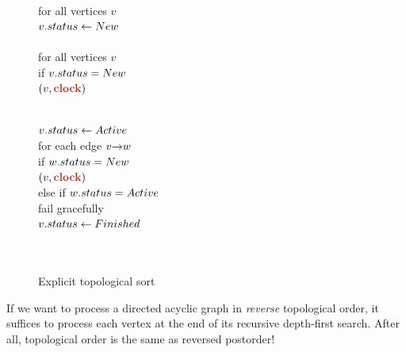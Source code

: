 \begin{figure}[ht]
\centering
\begin{minipage}[c]{0.47\linewidth}
\begin{pseudocode}
\footnotesize{}\\
for all vertices $v$\\
\Indent $v.status \gets New$\\
\\
for all vertices $v$\\
\Indent if $v.status = New$\\
\Indent{} $(v, \mbox{\color{JEred}\bfseries\Var{clock}})$\\
\end{pseudocode}
\end{minipage}\hfill
\begin{minipage}[c]{0.47\linewidth}
\begin{pseudocode}
\footnotesize{}\\
$v.status \gets Active$\\
for each edge $v\mathord{\rightarrow}w$\\
\Indent if $w.status = New$\\
\Indent{} $(v, \mbox{\color{JEred}\bfseries\Var{clock}})$\\
\Indent else if $w.status = Active$\\
\Indent\Indent fail gracefully\\
$v.status \gets Finished$\\
\\
\\
\end{pseudocode}
\end{minipage}
\caption{Explicit topological sort}
\label{fig:6.9}
\end{figure}

If we want to process a directed acyclic graph in \textit{reverse} topological order, it suffices to process each vertex at the end of its recursive depth-first search.
After all, topological order is the same as reversed postorder!

